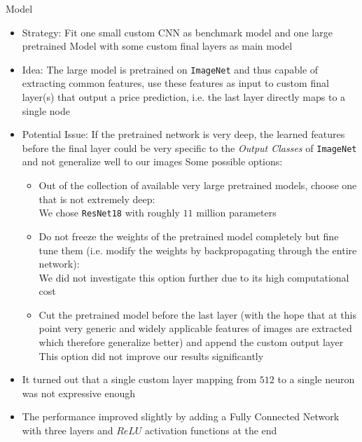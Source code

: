 \documentclass[12pt, letterpaper]{article}
\begin{document}
Model
\begin{itemize}
    \item Strategy: Fit one small custom CNN as benchmark model and one large pretrained Model with some custom final layers as main model
    \item Idea: The large model is pretrained on \texttt{ImageNet} and thus capable of extracting common features, use these features as input to custom final layer(s) that output a price prediction, i.e. the last layer directly maps to a single node
    \item Potential Issue: If the pretrained network is very deep, the learned features before the final layer could be very specific to the \emph{Output Classes} of \texttt{ImageNet} and not generalize well to our images
          Some possible options:
          \begin{itemize}
              \item Out of the collection of available very large pretrained models, choose one that is not extremely deep: \\
                    We chose \texttt{ResNet18} with roughly $11$ million parameters
              \item Do not freeze the weights of the pretrained model completely but fine tune them (i.e. modify the weights by backpropagating through the entire network): \\
                    We did not investigate this option further due to its high computational cost
              \item Cut the pretrained model before the last layer (with the hope that at this point very generic and widely applicable features of images are extracted which therefore generalize better) and append the custom output layer \\
                    This option did not improve our results significantly
          \end{itemize}
    \item It turned out that a single custom layer mapping from $512$ to a single neuron was not expressive enough
    \item The performance improved slightly by adding a Fully Connected Network with three layers and $ReLU$ activation functions at the end
\end{itemize}
\end{document}
